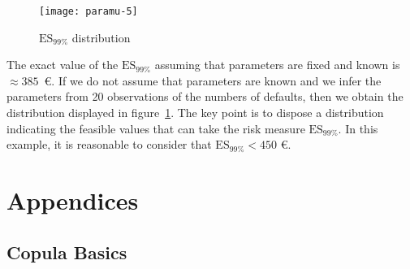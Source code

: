 \documentclass[11pt,fleqn]{book} %
\begin{document}
\begin{example}
\begin{lstlisting}[language=R, label={sc:paramu5}, caption={$ES_{99\%}$ distribution (R script)}]
	\end{lstlisting}
	\begin{figure}[!ht]
		\centering
		\texttt{[image: paramu-5]}
		\caption{$\text{ES}_{99\%}$ distribution}
		\label{fig:paramu5}
	\end{figure}
	The exact value of the $\text{ES}_{99\%}$ assuming that parameters 
	are fixed and known is $\approx 385$\ \euro. If we do not assume that 
	parameters are known and we infer the parameters from 20 observations 
	of the numbers of defaults, then we obtain the distribution displayed 
	in figure~\ref{fig:paramu5}. 
	The key point is to dispose a distribution indicating the 
	feasible values that can take the risk measure $\text{ES}_{99\%}$.
	In this example, it is reasonable to consider that 
	$\text{ES}_{99\%} < 450$ \euro.
\end{example}

\appendix
\chapter{Appendices}

\section{Copula Basics}
\label{ap:copula_basics}
\end{document}
